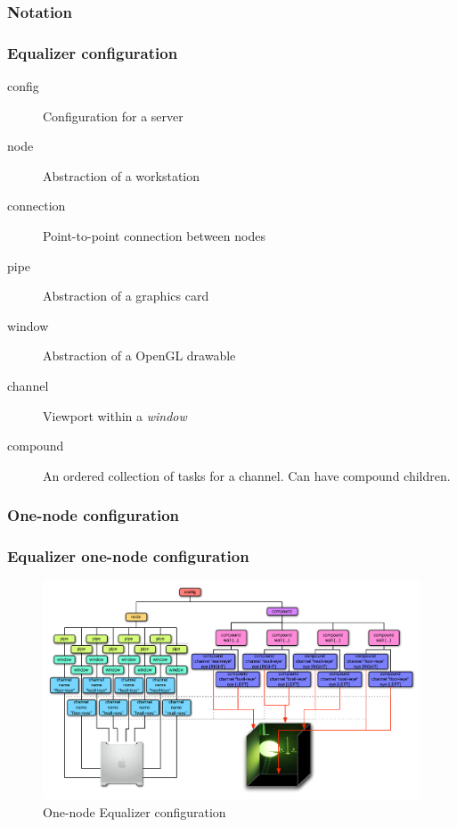 \subsubsection*{Notation}
\begin{frame}\frametitle{Equalizer configuration}
	\begin{description}
		\item[config] Configuration for a server
		\item[node] Abstraction of a workstation
		\item[connection] Point-to-point connection between nodes
		\item[pipe] Abstraction of a graphics card
		\item[window] Abstraction of a OpenGL drawable
		\item[channel] Viewport within a \emph{window}
		\item[compound] An ordered collection of tasks for a channel. Can have compound children.
	\end{description}
\end{frame}

\subsubsection*{One-node configuration}
\begin{frame}\frametitle{Equalizer one-node configuration}
	\begin{figure}
		\centering
		\includegraphics[width=\textwidth]{../figures/1nodeConfig}
		\caption{One-node Equalizer configuration}
	\end{figure}
\end{frame}

